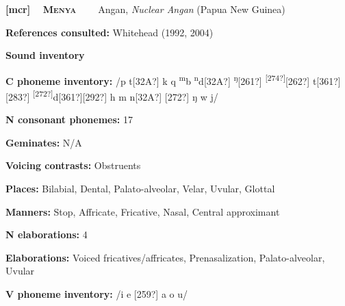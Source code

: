 \clearpage\begin{styleBody}
\textbf{[mcr] }\ \ \textbf{\textsc{Menya}}\textbf{\ \ \ \ }Angan, \textit{Nuclear Angan} (Papua New Guinea)
\end{styleBody}

\begin{styleBody}
\textbf{References consulted: }Whitehead (1992, 2004)
\end{styleBody}

\begin{styleBody}
\textbf{Sound inventory}
\end{styleBody}

\begin{styleBody}
\textbf{C phoneme inventory:} /p t[32A?] k q \textsuperscript{m}b \textsuperscript{n}d[32A?] \textsuperscript{ŋ}[261?] \textsuperscript{[274?]}[262?] t[361?][283?] \textsuperscript{[272?]}d[361?][292?] h m n[32A?] [272?] ŋ w j/
\end{styleBody}

\begin{styleBody}
\textbf{N consonant phonemes:} 17
\end{styleBody}

\begin{styleBody}
\textbf{Geminates:} N/A
\end{styleBody}

\begin{styleBody}
\textbf{Voicing contrasts:} Obstruents
\end{styleBody}

\begin{styleBody}
\textbf{Places:} Bilabial, Dental, Palato-alveolar, Velar, Uvular, Glottal
\end{styleBody}

\begin{styleBody}
\textbf{Manners:} Stop, Affricate, Fricative, Nasal, Central approximant
\end{styleBody}

\begin{styleBody}
\textbf{N elaborations:} 4
\end{styleBody}

\begin{styleBody}
\textbf{Elaborations:} Voiced fricatives/affricates, Prenasalization, Palato-alveolar, Uvular
\end{styleBody}

\begin{styleBody}
\textbf{V phoneme inventory:} /i e [259?] a o u/
\end{styleBody}

